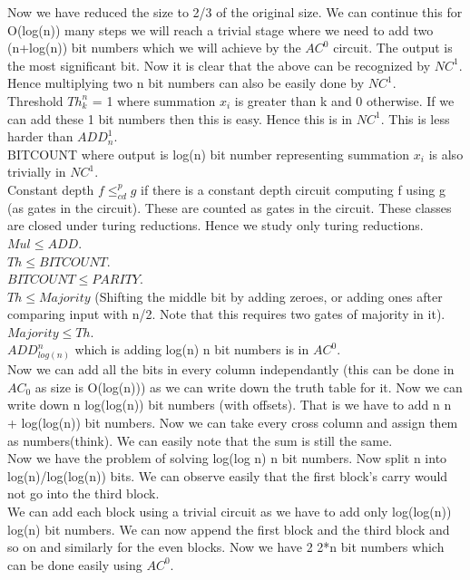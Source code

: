 \documentclass[solution,addpoints,12pt]{exam}
\begin{document}
Now we have reduced the size to 2/3 of the original size. We can
continue this for O(log(n)) many steps we will reach a trivial stage where we
need to add two (n+log(n)) bit numbers which we will achieve by the
${AC}^0$ circuit. The output is the most significant bit. Now it
is clear that the above can be recognized by ${NC}^1$.\\

Hence multiplying two n bit numbers can also be easily done by ${NC}^1$.\\
Threshold ${Th}_{k}^{n}$ = 1 where summation $x_i$ is greater than k and
0 otherwise. If we can add these 1 bit numbers then this is easy.
Hence this is in ${NC}^1$. This is less harder than ${ADD}_{n}^{1}$.\\

BITCOUNT where output is log(n) bit number representing summation $x_i$ is
also trivially in ${NC}^1$.\\

Constant depth $f \le_{cd}^{p} g$ if there is a constant
depth circuit computing f using g (as gates in the circuit).
These are counted as gates in the circuit. These
classes are closed under turing reductions. Hence we study only
turing reductions.\\

$Mul \le ADD$.\\
$Th \le BITCOUNT$.\\
$BITCOUNT \le PARITY$.\\
$Th \le Majority$ (Shifting the middle bit by adding zeroes, or adding ones
after comparing input with n/2. Note that this requires two gates of
majority in it).\\
$Majority \le Th$.\\
${ADD}_{log(n)}^{n}$ which is adding log(n) n bit numbers is in ${AC}^0$.\\
Now we can add all the bits in every column independantly (this can
be done in ${AC}_0$ as size is O(log(n))) as we can write down the truth table
for it. Now we can write down n log(log(n)) bit numbers (with offsets). That
is we have to add n n + log(log(n)) bit numbers. Now we can take
every cross column and assign them as numbers(think). We can easily note that
the sum is still the same.\\

Now we have the problem of solving log(log n) n bit numbers. Now
split n into log(n)/log(log(n)) bits. We can observe easily that
the first block's carry would not go into the third block.\\
We can add each block using a trivial circuit as we have to add only
log(log(n)) log(n) bit numbers. We can now append the
first block and the third block and so on and similarly for the
even blocks. Now we have 2 2*n bit numbers which can be done
easily using ${AC}^0$.\\
\end{document}
